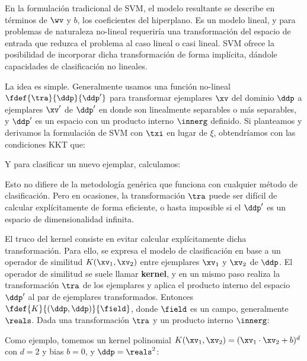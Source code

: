 En la formulación tradicional de SVM, el modelo resultante se describe en términos de $\wv$ y $b$, los coeficientes del hiperplano. Es un modelo lineal, y para problemas de naturaleza no-lineal requeriría una transformación del espacio de entrada que reduzca el problema al caso lineal o casi lineal. SVM ofrece la posibilidad de incorporar dicha transformación de forma implícita, dándole capacidades de clasificación no lineales. 

La idea es simple. Generalmente usamos una función no-lineal $\fdef{\tra}{\ddp}{\ddp'}$ para transformar ejemplares $\xv$ del dominio $\ddp$ a ejemplares $\xv'$ de $\ddp'$ en donde son linealmente separables o más separables, y $\ddp'$ es un espacio con un producto interno $\innerg$ definido. Si planteamos y derivamos la formulación de SVM con $\txi$ en lugar de $\xi$, obtendríamos con las condiciones KKT que:


Y para clasificar un nuevo ejemplar, calculamos:


Esto no difiere de la metodología genérica que funciona con cualquier método de clasificación. Pero en ocasiones, la transformación $\tra$ puede ser difícil de calcular explícitamente de forma eficiente, o hasta imposible si el $\ddp'$ es un espacio de dimensionalidad infinita. 

El truco del kernel consiste en evitar calcular explícitamente dicha transformación. Para ello, se expresa el modelo de clasificación en base a un operador de similitud $K(\xv_1,\xv_2)$ entre ejemplares $\xv_1$ y $\xv_2$ de $\ddp$. El operador de similitud se suele llamar \textbf{kernel},  y en un mismo paso realiza la transformación $\tra$ de los ejemplares y aplica el producto interno del espacio $\ddp'$ al par de ejemplares transformados. Entonces $\fdef{K}{(\ddp,\ddp)}{\field}$, donde $\field$ es un campo, generalmente $\reals$. Dada una transformación $\tra$ y un producto interno $\innerg$:


Como ejemplo, tomemos un kernel polinomial $
K(\xv_1,\xv_2)=(\xv_1 \cdot \xv_2+b)^d $ con $d=2$ y bias $b=0$, y $\ddp = \reals^2$:


